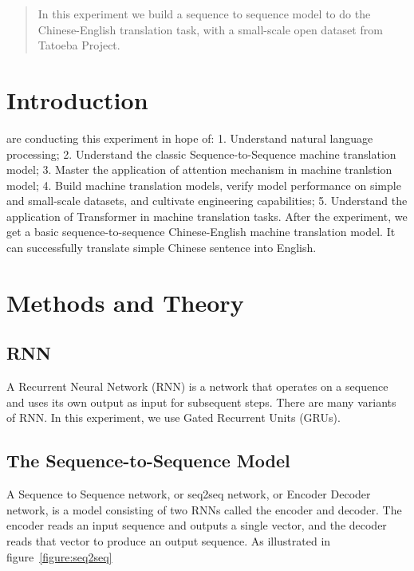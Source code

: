 \documentclass[journal, a4paper]{IEEEtran}
\begin{document}
\begin{abstract}
In this experiment we build a sequence to sequence model to do the Chinese-English translation task, with a small-scale open dataset from Tatoeba Project.
\end{abstract}

\section{Introduction}

 are conducting this experiment in hope of:
1. Understand natural language processing;
2. Understand the classic Sequence-to-Sequence machine translation model;
3. Master the application of attention mechanism in machine tranlstion model;
4. Build machine translation models, verify model performance on simple and small-scale datasets, and cultivate engineering capabilities;
5. Understand the application of Transformer in machine translation tasks.
After the experiment, we get a basic sequence-to-sequence Chinese-English machine translation model. It can successfully translate simple Chinese sentence into English.

\section{Methods and Theory}

\subsection{RNN}

A Recurrent Neural Network (RNN) is a network that operates on a sequence and uses its own output as input for subsequent steps. There are many variants of RNN. In this experiment, we use Gated Recurrent Units (GRUs).

\subsection{The Sequence-to-Sequence Model}

A Sequence to Sequence network, or seq2seq network, or Encoder Decoder network, is a model consisting of two RNNs called the encoder and decoder. The encoder reads an input sequence and outputs a single vector, and the decoder reads that vector to produce an output sequence. As illustrated in figure~\ref{figure:seq2seq}
\end{document}
